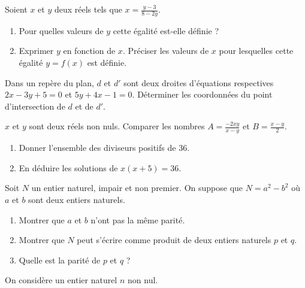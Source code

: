  \begin{titreTice}[Synthèse]

\end{titreTice}



Soient $x$ et $y$ deux réels tels que $x=\frac{y-3}{8-2y}$.

\begin{enumerate}
\item Pour quelles valeurs de $y$ cette égalité est-elle définie ?
\item Exprimer $y$ en fonction de $x$. Préciser les valeurs de $x$ pour lesquelles cette égalité $y=f(x)$ est définie.
\end{enumerate}



Dans un repère du plan, $d$ et $d'$ sont deux droites d'équations respectives $2x-3y+5=0$ et $5y+4x-1=0$. Déterminer les coordonnées du point d'intersection de $d$ et de $d'$. 



$x$ et $y$ sont deux réels non nuls. Comparer les nombres $A = \frac{-2xy}{x-y}$ et $B=\frac{x-y}{2}$.



\begin{enumerate}
\item Donner l'ensemble des diviseurs positifs de 36.
\item En déduire les solutions de $x(x+5)=36$.
\end{enumerate}


Soit $N$ un entier naturel, impair et non premier. On suppose que $N=a^2-b^2$ où $a$ et $b$ sont deux entiers naturels.

\begin{enumerate}
\item Montrer que $a$ et $b$ n'ont pas la même parité.
\item Montrer que $N$ peut s'écrire comme produit de deux entiers naturels $p$ et $q$.
\item Quelle est la parité de $p$ et $q$ ? 
\end{enumerate}



On considère un entier naturel $n$ non nul. 

